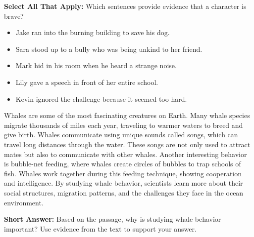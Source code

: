 \documentclass[12pt]{article}
\begin{document}
\begin{tcolorbox}[colframe=black!50, colback=white, title=Question 5]
\textbf{Select All That Apply:} Which sentences provide evidence that a character is brave?  
\begin{itemize}
\item Jake ran into the burning building to save his dog.  
\item Sara stood up to a bully who was being unkind to her friend.  
\item Mark hid in his room when he heard a strange noise.  
\item Lily gave a speech in front of her entire school.  
\item Kevin ignored the challenge because it seemed too hard.  
\end{itemize}
\end{tcolorbox}



\begin{tcolorbox}[colframe=black!50, colback=white, title=Passage: Whale Behavior]
Whales are some of the most fascinating creatures on Earth. Many whale species migrate thousands of miles each year, traveling to warmer waters to breed and give birth. Whales communicate using unique sounds called songs, which can travel long distances through the water. These songs are not only used to attract mates but also to communicate with other whales. Another interesting behavior is bubble-net feeding, where whales create circles of bubbles to trap schools of fish. Whales work together during this feeding technique, showing cooperation and intelligence. By studying whale behavior, scientists learn more about their social structures, migration patterns, and the challenges they face in the ocean environment.
\end{tcolorbox}

\begin{tcolorbox}[colframe=black!50, colback=white, title=Question 6]
\textbf{Short Answer:} Based on the passage, why is studying whale behavior important? Use evidence from the text to support your answer.

\vspace{2em}
 \underline{\hspace{15.8cm}}  
    \\[0.8cm] \underline{\hspace{15.8cm}}  
    \\[0.8cm] \underline{\hspace{15.8cm}}  
    \\[0.8cm] \underline{\hspace{15.8cm}} 
    \\[0.8cm] \underline{\hspace{15.8cm}}  
    \\[0.8cm] \underline{\hspace{15.8cm}} 
\end{tcolorbox}
\end{document}
